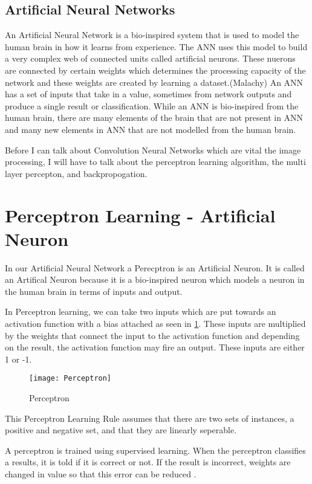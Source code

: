 \subsection*{Artificial Neural Networks}
An Artificial Neural Network is a bio-inspired system that is used to model the human brain in how it learns from experience.
The ANN uses this model to build a very complex web of connected units called
artificial neurons.
These nuerons are connected by certain weights which determines the processing
capacity of the network and these weights are created by learning a
dataset.(Malachy)
An ANN has a set of inputs that take in a value, sometimes from network outputs
and produce a single result or classification.
While an ANN is bio-inspired from the human brain, there are many elements of
the brain that are not present in ANN and many new elements in ANN that are not
modelled from the human brain.

Before I can talk about Convolution Neural Networks which are vital the image
processing, I will have to talk about the perceptron learning algorithm, the multi
layer percepton, and backpropogation.

\section{Perceptron Learning - Artificial Neuron}
In our Artificial Neural Network a Perecptron is an Artificial Neuron.
It is called an Artifical Neuron because it is a bio-inspired neuron which models
a neuron in the human brain in terms of inputs and output.

In Perceptron learning, we can take two inputs which are put towards an
activation function with a bias attached as seen in \ref{fig:perceptron}.
These inputs are multiplied by the weights that connect the input to the
activation function and depending on the result, the activation function may
fire an output. These inputs are either 1 or -1.

\begin{figure}
     \texttt{[image: Perceptron]}
     \caption{Perceptron}
     \label{fig:perceptron}
\end{figure}

This Perceptron Learning Rule assumes that there are two sets of instances, a
positive and negative set, and that they are linearly seperable.

A perceptron is trained using supervised learning. When the perceptron
classifies a results, it is told if it is correct or not. If the result is
incorrect, weights are changed in value so that this error can be reduced
\textcite{AI}. 

